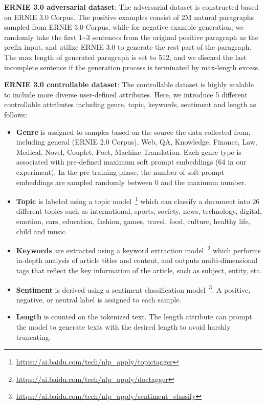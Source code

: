 {\textbf{ERNIE 3.0 adversarial dataset}}: The adversarial dataset is constructed based on ERNIE 3.0 Corpus. The positive examples consist of 2M natural paragraphs sampled from ERNIE 3.0 Corpus, while for negative example generation, we randomly take the first 1\textasciitilde 3 sentences from the original positive paragraph as the prefix input, and utilize ERNIE 3.0 to generate the rest part of the paragraph. The  max length of generated paragraph is set to 512, and we discard the last incomplete sentence if the generation process is terminated by max-length excess.

{\textbf{ERNIE 3.0 controllable dataset}}: The controllable dataset is highly scalable to include more diverse user-defined attributes. Here, we introduce 5 different controllable attributes including genre, topic, keywords, sentiment and length as follows:

\begin{itemize}
    \item \textbf{Genre} is assigned to samples based on the source the data collected from, including general (ERNIE 2.0 Corpus), Web, QA, Knowledge, Finance, Law, Medical, Novel, Couplet, Poet, Machine Translation. Each genre type is associated with pre-defined maximum soft prompt embeddings (64 in our experiment). In the pre-training phase, the number of soft prompt embeddings are sampled randomly between 0 and the maximum number.
    \item \textbf{Topic} is labeled using a topic model~\footnote{\url{https://ai.baidu.com/tech/nlp_apply/topictagger}} which can classify a document into 26 different topics such as international, sports, society, news, technology, digital, emotion, cars, education, fashion, games, travel, food, culture, healthy life, child and music.
    \item \textbf{Keywords} are extracted using a keyword extraction model~\footnote{\url{https://ai.baidu.com/tech/nlp_apply/doctagger}} which performs in-depth analysis of article titles and content, and outputs multi-dimensional tags that reflect the key information of the article, such as subject, entity, etc.
    \item \textbf{Sentiment} is derived using a sentiment classification model~\footnote{\url{https://ai.baidu.com/tech/nlp_apply/sentiment_classify}}. A positive, negative, or neutral label is assigned to each sample.
    \item \textbf{Length} is counted on the tokenized text. The length attribute can prompt the model to generate texts with the desired length to avoid harshly truncating.
\end{itemize}

